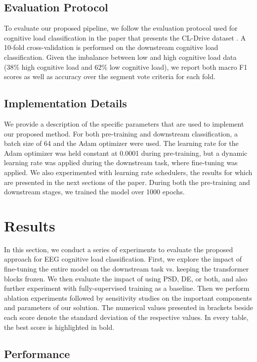 \documentclass[sigconf]{acmart}
\begin{document}
\subsection{Evaluation Protocol}
To evaluate our proposed pipeline, we follow the evaluation protocol used for cognitive load classification in the paper that presents the CL-Drive dataset \cite{angkan2023multimodal}. A 10-fold cross-validation is performed on the downstream cognitive load classification. Given the imbalance between low and high cognitive load data (38\% high cognitive load and 62\% low cognitive load), we report both macro F1 scores as well as accuracy over the segment vote criteria for each fold. 


\subsection{Implementation Details}\label{Implementation Details}
We provide a description of the specific parameters that are used to implement our proposed method. For both pre-training and downstream classification, a batch size of 64 and the Adam optimizer were used. The learning rate for the Adam optimizer was held constant at 0.0001 during pre-training, but a dynamic learning rate was applied during the downstream task, where fine-tuning was applied. We also experimented with learning rate schedulers, the results for which are presented in the next sections of the paper. During both the pre-training and downstream stages, we trained the model over 1000 epochs.

\section{Results}\label{results}     
In this section, we conduct a series of experiments to evaluate the proposed approach for EEG cognitive load classification. First, we explore the impact of fine-tuning the entire model on the downstream task vs. keeping the transformer blocks frozen. We then evaluate the impact of using PSD, DE, or both, and also further experiment with fully-supervised training as a baseline. Then we perform ablation experiments followed by sensitivity studies on the important components and parameters of our solution. The numerical values presented in brackets beside each score denote the standard deviation of the respective values. In every table, the best score is highlighted in bold.

\subsection{Performance}\label{FrozenVFine}
\end{document}
